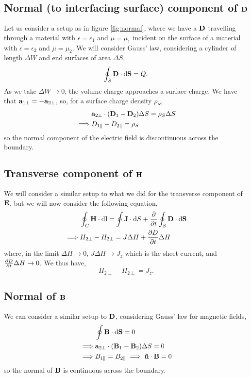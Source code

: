 \documentclass{book}
\begin{document}
\subsection{Normal (to interfacing surface) component of $\vb{D}$}
Let us consider a setup as in figure \ref{fig:normal}, where we have a $\vb{D}$ travelling through a material with $\epsilon = \epsilon_1$ and $\mu = \mu_1$ incident on the surface of a material with $\epsilon = \epsilon_2$ and $\mu = \mu_2$. We will consider Gauss' law, considering a cylinder of length $\Delta W$ and end surfaces of area $\Delta S$, 
\begin{equation}
	\oint_S\vb{D}\cdot\dd{\vb{S}} = Q.
\end{equation}
As we take $\Delta W \to 0$, the volume charge approaches a surface charge. We have that $\vb{a}_{1\perp} = -\vb{a}_{2\perp}$, so, for a surface charge density $\rho_S$,
\begin{equation}
	\begin{split}
		& \vb{a}_{2\perp}\cdot(\vb{D}_1 - \vb{D}_2)\Delta S = \rho_S\Delta S \\
		\implies & D_{1\parallel} - D_{2\parallel} = \rho_S
	\end{split}
\end{equation}
so the normal component of the electric field is discontinuous across the boundary.
\subsection{Transverse component of $\vb{H}$}
We will consider a similar setup to what we did for the transverse component of $\vb{E}$, but we will now consider the following equation,
\begin{equation}
	\begin{split}
		&\oint_C \vb{H}\cdot\dd{\vb{l}} = \oint \vb{J}\cdot \dd{S} + \pdv{t}\oint_S\vb{D}\cdot\dd{\vb{S}}\\
		\implies & H_{2\perp} -H_{2\perp} = J\Delta H + \pdv{D}{t}\Delta H
	\end{split}
\end{equation}
where, in the limit $\Delta H \to 0$, $J\Delta H \to J_z$ which is the sheet current, and $\pdv{D}{t}\Delta H \to 0$. We thus have,
\begin{equation}
	H_{2\perp} - H_{2\perp} = J_z. \label{eq:bperp}
\end{equation} 
\subsection{Normal of $\vb{B}$}
We can consider a similar setup to $\vb{D}$, considering Gauss' law for magnetic fields,
\begin{equation}
	\begin{split}
	&\oint\vb{B}\cdot\dd{\vb{S}} = 0 \\
	\implies & \vb{a}_{2\perp}\cdot(\vb{B}_1 - \vb{B}_2)\Delta S = 0 \\
	\implies & B_{1\parallel} = B_{2\parallel} \implies \vu{n}\cdot\vb{B} = 0
	\end{split}
\end{equation}
so the normal of $\vb{B}$ is continuous across the boundary.
\end{document}
